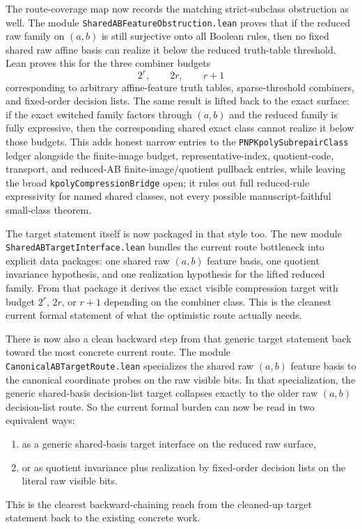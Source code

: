 \documentclass[11pt]{article}
\theoremstyle{remark}
\begin{document}
The route-coverage map now records the matching strict-subclass obstruction as
well.  The module \texttt{SharedABFeatureObstruction.lean} proves that if the
reduced raw family on \((a,b)\) is still surjective onto all Boolean rules,
then no fixed shared raw affine basis can realize it below the reduced
truth-table threshold.  Lean proves this for the three combiner budgets
\[
  2^r, \qquad 2r, \qquad r+1
\]
corresponding to arbitrary affine-feature truth tables, sparse-threshold
combiners, and fixed-order decision lists.  The same result is lifted back to
the exact surface: if the exact switched family factors through \((a,b)\) and
the reduced family is fully expressive, then the corresponding shared exact
class cannot realize it below those budgets.  This adds honest narrow entries
to the \texttt{PNPKpolySubrepairClass} ledger alongside the finite-image
budget, representative-index, quotient-code, transport, and reduced-AB
finite-image/quotient pullback entries, while leaving the broad
\texttt{kpolyCompressionBridge} open; it
rules out full reduced-rule expressivity for named shared classes, not every
possible manuscript-faithful small-class theorem.

The target statement itself is now packaged in that style too.  The new module
\texttt{SharedABTargetInterface.lean} bundles the current route bottleneck into
explicit data packages: one shared raw \((a,b)\) feature basis, one quotient
invariance hypothesis, and one realization hypothesis for the lifted reduced
family.  From that package it derives the exact visible compression target with
budget \(2^r\), \(2r\), or \(r+1\) depending on the combiner class.  This is
the cleanest current formal statement of what the optimistic route actually
needs.

There is now also a clean backward step from that generic target statement back
toward the most concrete current route.  The module
\texttt{CanonicalABTargetRoute.lean} specializes the shared raw \((a,b)\)
feature basis to the canonical coordinate probes on the raw visible bits.  In
that specialization, the generic shared-basis decision-list target collapses
exactly to the older raw \((a,b)\) decision-list route.  So the current formal
burden can now be read in two equivalent ways:
\begin{enumerate}[leftmargin=1.5em]
  \item as a generic shared-basis target interface on the reduced raw surface,
  \item or as quotient invariance plus realization by fixed-order decision
  lists on the literal raw visible bits.
\end{enumerate}
This is the clearest backward-chaining reach from the cleaned-up target
statement back to the existing concrete work.
\end{document}
